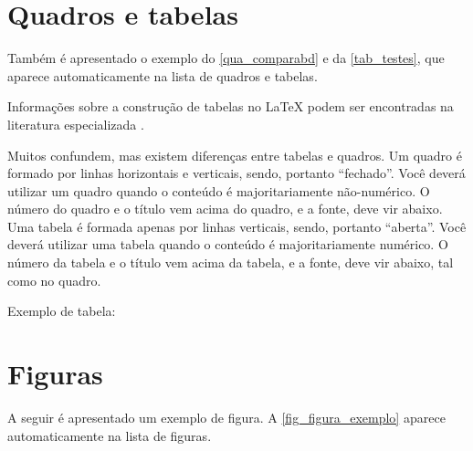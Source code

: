 \begin{apendicesenv}
    \newpage

    \section{Quadros e tabelas}
    \label{sec_tabelas}

    Também é apresentado o exemplo do \autoref{qua_comparabd} e da \autoref{tab_testes}, que aparece automaticamente na lista de quadros e tabelas.

    Informações sobre a construção de tabelas no \LaTeX{} podem ser encontradas na literatura especializada \cite{Lamport1986,Buerger1989,Kopka2003,Mittelbach2004}.

    

    Muitos confundem, mas existem diferenças entre  tabelas e  quadros.
    Um quadro é formado por linhas horizontais e verticais, sendo, portanto ``fechado''.
    Você deverá utilizar um quadro quando o conteúdo é majoritariamente não-numérico.
    O número do quadro e o título vem acima do quadro, e a fonte, deve vir abaixo.
    Uma tabela é formada apenas por linhas verticais, sendo, portanto ``aberta''.
    Você deverá utilizar uma tabela quando o conteúdo é majoritariamente numérico.
    O número da tabela e o título vem acima da tabela, e a fonte, deve vir abaixo, tal como no quadro.

    Exemplo de tabela:

    

    \newpage

    \section{Figuras}
    \label{sec_figuras}

    A seguir é apresentado um exemplo de figura.
    A \autoref{fig_figura_exemplo} aparece automaticamente na lista de figuras.


\end{apendicesenv}
